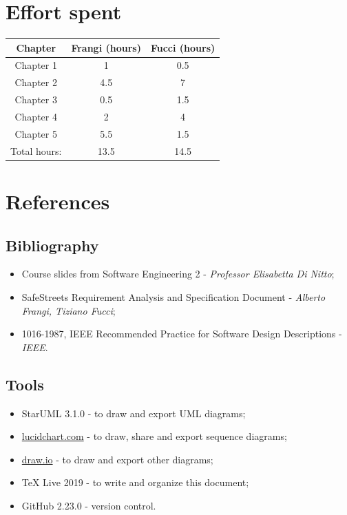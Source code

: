 \documentclass[12pt,a4paper]{report}
\begin{document}
	\chapter{Effort spent}
		\begin{table}[H]
			\centering
			\begin{tabular}[width = \textwidth]{|c|c|c|}
				\hline
				Chapter & Frangi (hours) & Fucci (hours)\\
				\hline
				\hline
				Chapter 1 & 1 & 0.5\\
				
				Chapter 2 & 4.5 & 7\\
				
				Chapter 3 & 0.5 & 1.5\\
				
				Chapter 4 & 2 & 4\\
				
				Chapter 5 & 5.5 & 1.5\\
				
				Total hours: & 13.5 & 14.5\\
				\hline
			\end{tabular}
			\label{tab: }
		\end{table}
	\chapter{References}
		\section{Bibliography}
		\begin{itemize}
			\item Course slides from Software Engineering 2 - \emph{Professor Elisabetta Di Nitto};
			\item SafeStreets Requirement Analysis and Specification Document - \emph{Alberto Frangi, Tiziano Fucci};
			\item 1016-1987, IEEE Recommended Practice for Software Design Descriptions - \emph{IEEE}.
		\end{itemize}
		\section{Tools}	
		\begin{itemize}		
		\item StarUML 3.1.0 - to draw and export UML diagrams;
		\item \url{lucidchart.com} - to draw, share and export sequence diagrams;
		\item \url{draw.io} - to draw and export other diagrams;
		\item TeX Live 2019 - to write and organize this document;
		\item GitHub 2.23.0 - version control.
		\end{itemize}
\end{document}
